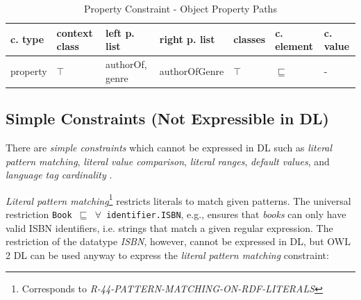 \documentclass{llncs}
\newcommand{\ms}[1]{\texttt{#1}}
\begin{document}
\begin{table}
  \scriptsize
  \sffamily
  \vspace{0cm}
	\centering
		\begin{tabular}{l|l|l|l|l|l|l}
      \textbf{c. type} & \textbf{context class} & \textbf{left p. list} & \textbf{right p. list} & \textbf{classes} & \textbf{c. element} & \textbf{c. value} \\
      \hline
      property & $\top$ & authorOf, genre & authorOfGenre & $\top$ & $\sqsubseteq$ & - \\
		\end{tabular}
	\caption{Property Constraint - Object Property Paths}
	\label{tab:property-constraint-object-property-paths}
\end{table}

\subsection{Simple Constraints (Not Expressible in DL)}

There are \emph{simple constraints} which cannot be expressed in DL such as \emph{literal pattern matching}, \emph{literal value comparison}, \emph{literal ranges}, \emph{default values}, and \emph{language tag cardinality} \cite{BoschNolleAcarEckert2015}.

{\em Literal pattern matching}\footnote{Corresponds to {\em R-44-PATTERN-MATCHING-ON-RDF-LITERALS}} restricts literals to match given patterns.
The universal restriction \ms{Book $\sqsubseteq$ $\forall$ identifier.ISBN}, e.g., ensures that \emph{books} can only have valid ISBN identifiers, 
i.e. strings that match a given regular expression. 
The restriction of the datatype \emph{ISBN}, however, cannot be expressed in DL, but OWL 2 DL can be used anyway to express the \emph{literal pattern matching} constraint:
\end{document}

